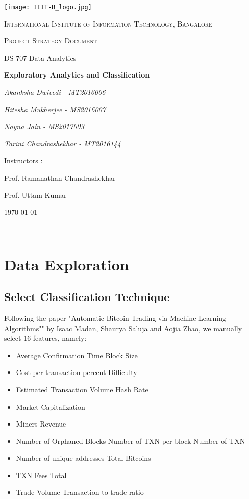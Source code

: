 \documentclass{article}
\begin{document}
\begin{titlepage}
	\centering
	\texttt{[image: IIIT-B\_logo.jpg]}\par\vspace{1cm}
	{\scshape\LARGE International Institute of Information Technology, Bangalore \par}
	\vspace{1cm}
	{\scshape\Large Project Strategy Document\par}
	{\Large  DS 707 Data Analytics\par}
	\vspace{1.5cm}
	{\huge\bfseries Exploratory Analytics and Classification \par}
	\vspace{2cm}
	{\Large\itshape Akanksha Dwivedi - MT2016006\par}
	{\Large\itshape Hitesha Mukherjee - MS2016007\par}
	{\Large\itshape Nayna Jain - MS2017003\par}
	{\Large\itshape Tarini Chandrashekhar - MT2016144\par}
	\vfill
	Instructors : \par
	Prof. Ramanathan Chandrashekhar
	\par
	Prof. Uttam Kumar

	\vfill
	{\large \today\par}
\end{titlepage}

\newpage

\tableofcontents

\newpage
\justify

\

\section{Data Exploration}

\subsection{Select Classification
Technique }
Following the paper "Automatic Bitcoin Trading via Machine Learning Algorithms"" by Isaac Madan, Shaurya Saluja and Aojia Zhao, we manually select 16 features, namely:
\begin{itemize}
\item Average Confirmation Time Block Size
\item Cost per transaction percent Difficulty
\item Estimated Transaction Volume Hash Rate
\item Market Capitalization
\item Miners Revenue
\item Number of Orphaned Blocks Number of TXN per block Number of TXN
\item Number of unique addresses Total Bitcoins
\item TXN Fees Total
\item Trade Volume Transaction to trade ratio
\end{itemize}
\end{document}
